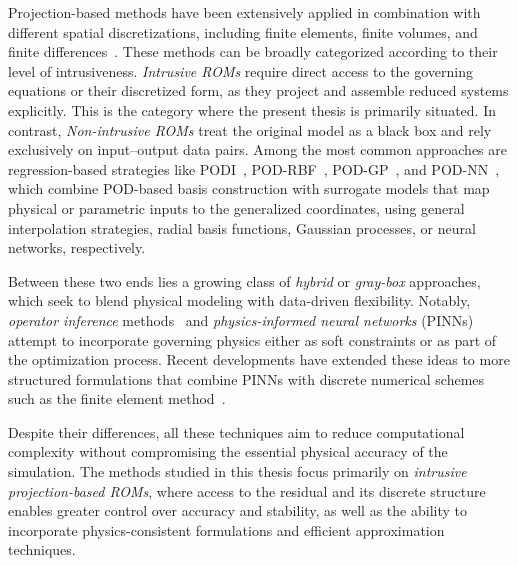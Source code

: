 Projection-based methods have been extensively applied in combination with different spatial discretizations, including finite elements, finite volumes, and finite differences~\cite{balajewicz2016projection,mcclellan2020projection,lucia2003projection}. These methods can be broadly categorized according to their level of intrusiveness. \textit{Intrusive ROMs} require direct access to the governing equations or their discretized form, as they project and assemble reduced systems explicitly. This is the category where the present thesis is primarily situated. In contrast, \textit{Non-intrusive ROMs} treat the original model as a black box and rely exclusively on input–output data pairs. Among the most common approaches are regression-based strategies like PODI~\cite{demo2019non}, POD-RBF~\cite{ostrowski2008solving}, POD-GP~\cite{ma2021data}, and POD-NN~\cite{hesthaven2018non}, which combine POD-based basis construction with surrogate models that map physical or parametric inputs to the generalized coordinates, using general interpolation strategies, radial basis functions, Gaussian processes, or neural networks, respectively.

Between these two ends lies a growing class of \textit{hybrid} or \textit{gray-box} approaches, which seek to blend physical modeling with data-driven flexibility. Notably, \textit{operator inference} methods~\cite{Peherstorfer2016,benner2020operator} and \textit{physics-informed neural networks} (PINNs)~\cite{raissi2019physics, chen2021physics} attempt to incorporate governing physics either as soft constraints or as part of the optimization process. Recent developments have extended these ideas to more structured formulations that combine PINNs with discrete numerical schemes such as the finite element method~\cite{gao2022physics,as2022mechanics}.

Despite their differences, all these techniques aim to reduce computational complexity without compromising the essential physical accuracy of the simulation. The methods studied in this thesis focus primarily on \textit{intrusive projection-based ROMs}, where access to the residual and its discrete structure enables greater control over accuracy and stability, as well as the ability to incorporate physics-consistent formulations and efficient approximation techniques.

